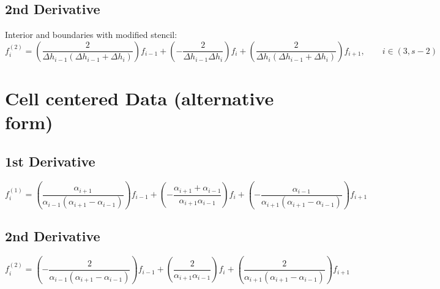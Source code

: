 \documentclass[landscape]{article}
\begin{document}
\subsection{2nd Derivative}
Interior and boundaries with modified stencil:
\begin{equation}
f^{{(2)}}_{i} = \left(\frac{2}{\Delta h_{{i-1}} \left(\Delta h_{{i-1}} + \Delta h_{{i}}\right)}\right)f_{{i-1}}+ \left(- \frac{2}{\Delta h_{{i-1}} \Delta h_{{i}}}\right)f_{{i}}+ \left(\frac{2}{\Delta h_{{i}} \left(\Delta h_{{i-1}} + \Delta h_{{i}}\right)}\right)f_{{i+1}}
, \qquad
  i \in (3,s-2)
 \end{equation}

\section{Cell centered Data (alternative form)}
\subsection{1st Derivative}
\begin{equation}
f^{{(1)}}_{i} = \left(\frac{\alpha_{{i+1}}}{\alpha_{{i-1}} \left(\alpha_{{i+1}} - \alpha_{{i-1}}\right)}\right)f_{{i-1}}+ \left(- \frac{\alpha_{{i+1}} + \alpha_{{i-1}}}{\alpha_{{i+1}} \alpha_{{i-1}}}\right)f_{{i}}+ \left(- \frac{\alpha_{{i-1}}}{\alpha_{{i+1}} \left(\alpha_{{i+1}} - \alpha_{{i-1}}\right)}\right)f_{{i+1}}
 \end{equation}

\subsection{2nd Derivative}
\begin{equation}
f^{{(2)}}_{i} = \left(- \frac{2}{\alpha_{{i-1}} \left(\alpha_{{i+1}} - \alpha_{{i-1}}\right)}\right)f_{{i-1}}+ \left(\frac{2}{\alpha_{{i+1}} \alpha_{{i-1}}}\right)f_{{i}}+ \left(\frac{2}{\alpha_{{i+1}} \left(\alpha_{{i+1}} - \alpha_{{i-1}}\right)}\right)f_{{i+1}}
 \end{equation}
\end{document}
